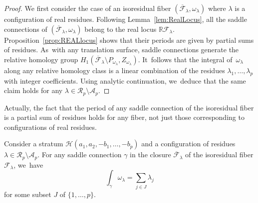 \begin{proof}
We first consider the case of an isoresidual fiber $(\overline{\mathcal{F}}_{\lambda},\omega_{\lambda})$ where $\lambda$ is a configuration of real residues. Following Lemma~\ref{lem:RealLocus}, all the saddle connections of $(\overline{\mathcal{F}}_{\lambda},\omega_{\lambda})$ belong to the real locus $\mathbb{R}\mathcal{F}_{\lambda}$. Proposition~\ref{prop:REALlocus} shows that their periods are given by partial sums of residues. As~with any translation surface, saddle connections generate the relative homology group $H_{1}(\overline{\mathcal{F}}_{\lambda} \setminus P_{\omega_{\lambda}},Z_{\omega_{\lambda}})$. It~follows that the integral of~$\omega_{\lambda}$ along any relative homology class is a linear combination of the residues $\lambda_{1},\dots,\lambda_{p}$ with integer coefficients. Using analytic continuation, we~deduce that the same claim holds for any $\lambda \in \mathcal{R}_{p} \setminus \mathcal{A}_{p}$.
\end{proof}

Actually, the fact that the period of any saddle connection of the isoresidual fiber is a partial sum of residues holds for any fiber, not just those corresponding to configurations of real residues.

\begin{prop}\label{prop:SCperiod}
Consider a stratum $\mathcal{H}(a_{1},a_{2},-b_{1},\dots,-b_{p})$ and a configuration of residues
$\lambda \in \mathcal{R}_{p} \setminus \mathcal{A}_{p}$. For any saddle connection $\gamma$ in the closure $\overline{\mathcal{F}}_{\lambda}$ of the isoresidual fiber $\mathcal{F}_{\lambda}$, we~have\vspace*{-3pt}\enlargethispage{.5\baselineskip}
\[
\int_{\gamma} \omega_{\lambda} = \sum_{j \in J} \lambda_{j}
\]
for some subset $J$ of $\lbrace{ 1,\dots,p \rbrace}$.
\end{prop}

